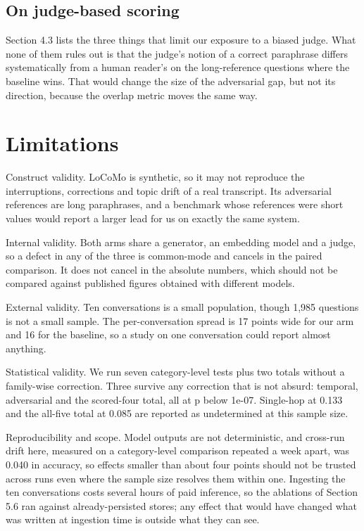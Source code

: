 \documentclass[10pt,a4paper,twocolumn]{article}
\begin{document}
\subsection{On judge-based scoring}

Section 4.3 lists the three things that limit our exposure to a biased judge. What none of them rules out is that the judge's notion of a correct paraphrase differs systematically from a human reader's on the long-reference questions where the baseline wins. That would change the size of the adversarial gap, but not its direction, because the overlap metric moves the same way.

\section*{Limitations}

Construct validity. LoCoMo is synthetic, so it may not reproduce the interruptions, corrections and topic drift of a real transcript. Its adversarial references are long paraphrases, and a benchmark whose references were short values would report a larger lead for us on exactly the same system.

Internal validity. Both arms share a generator, an embedding model and a judge, so a defect in any of the three is common-mode and cancels in the paired comparison. It does not cancel in the absolute numbers, which should not be compared against published figures obtained with different models.

External validity. Ten conversations is a small population, though 1,985 questions is not a small sample. The per-conversation spread is 17 points wide for our arm and 16 for the baseline, so a study on one conversation could report almost anything.

Statistical validity. We run seven category-level tests plus two totals without a family-wise correction. Three survive any correction that is not absurd: temporal, adversarial and the scored-four total, all at p below 1e-07. Single-hop at 0.133 and the all-five total at 0.085 are reported as undetermined at this sample size.

Reproducibility and scope. Model outputs are not deterministic, and cross-run drift here, measured on a category-level comparison repeated a week apart, was 0.040 in accuracy, so effects smaller than about four points should not be trusted across runs even where the sample size resolves them within one. Ingesting the ten conversations costs several hours of paid inference, so the ablations of Section 5.6 ran against already-persisted stores; any effect that would have changed what was written at ingestion time is outside what they can see.
\end{document}
